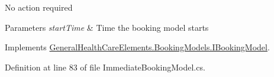 No action required 


\begin{DoxyParams}{Parameters}
{\em start\+Time} & Time the booking model starts\\
\hline
\end{DoxyParams}


Implements \hyperlink{interface_general_health_care_elements_1_1_booking_models_1_1_i_booking_model_aa8b737bc34bf3beaa06e72baee657ee1}{General\+Health\+Care\+Elements.\+Booking\+Models.\+I\+Booking\+Model}.



Definition at line 83 of file Immediate\+Booking\+Model.\+cs.

